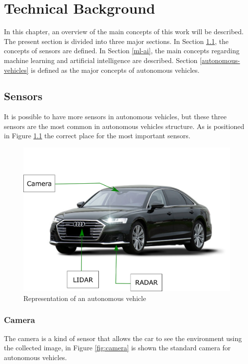 \chapter{Technical Background}
\label{capitulo3}

In this chapter, an overview of the main concepts of this work will be described. The present section is divided into three major sections. In Section \ref{sensors}, the concepts of sensors are defined. In Section \ref{ml-ai}, the main concepts regarding machine learning and artificial intelligence are described. Section \ref{autonomous-vehicles} is defined as the major concepts of autonomous vehicles.

\section{Sensors}\label{sensors}

It is possible to have more sensors in autonomous vehicles, but these three sensors are the most common in autonomous vehicles structure. As is positioned in Figure \ref{fig:autonomous-vehicles} the correct place for the most important sensors.


\begin{figure}[H]
\centering
\includegraphics[scale=0.7]{imagens/image823.png}
\caption{Representation of an autonomous vehicle}
\label{fig:autonomous-vehicles}
\end{figure}


\subsection{Camera}
The camera is a kind of sensor that allows the car to see the environment using the collected image, in Figure \ref{fig:camera} is shown the standard camera for autonomous vehicles.

